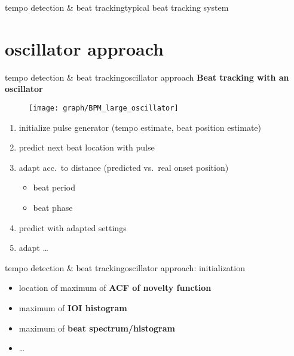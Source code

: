        \begin{frame}{tempo detection \& beat tracking}{typical beat tracking system}
        \begin{figure}
        \scalebox{.75}{
			\centering
				}
		\end{figure}
        \end{frame}

    \section{oscillator approach}
        \begin{frame}{tempo detection \& beat tracking}{oscillator approach}
            \textbf{Beat tracking with an oscillator}
            \begin{figure}
                \centering
                    \texttt{[image: graph/BPM\_large\_oscillator]}
            \end{figure}
            
            \begin{enumerate}
                \item	initialize pulse generator (tempo estimate, beat position estimate)
                \item<2->	predict next beat location with pulse
                \item<3->	adapt acc.\ to distance (predicted vs.\ real onset position)
                    \begin{itemize}
                        \item	beat period
                        \item	beat phase
                    \end{itemize}
                \item<4->	predict with adapted settings
                \item<4->   adapt \ldots
            \end{enumerate}
        \end{frame}
        \begin{frame}{tempo detection \& beat tracking}{oscillator approach: initialization}

            \begin{itemize}
                \item	location of maximum of \textbf{ACF of novelty function}
                \item<2->	maximum of \textbf{IOI histogram}
                \item<2->	maximum of \textbf{beat spectrum/histogram}
                \item<2->	\ldots
            \end{itemize}
        \end{frame}
